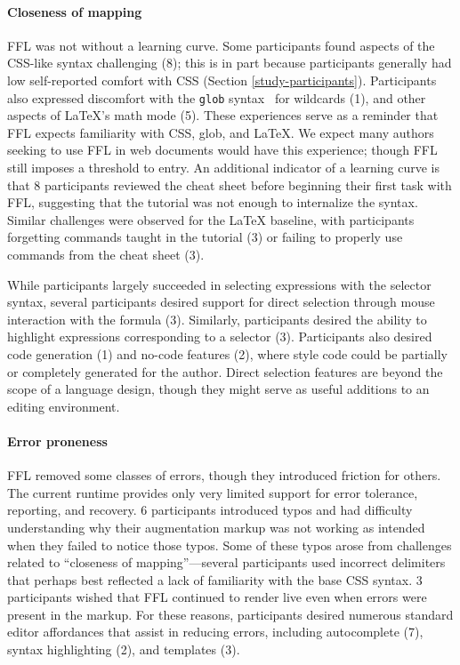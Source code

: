 \paragraph{Closeness of mapping}
FFL was not without a learning curve. Some participants found aspects of the CSS-like syntax challenging (8); this is in part because participants generally had low self-reported comfort with CSS (Section \ref{study-participants}). Participants also expressed discomfort with the \texttt{glob} syntax~\cite{UnixMan} for wildcards (1), and other aspects of LaTeX's math mode (5). These experiences serve as a reminder that FFL expects familiarity with CSS, glob, and LaTeX. We expect many authors seeking to use FFL in web documents would have this experience; though FFL still imposes a threshold to entry. An additional indicator of a learning curve is that 8 participants reviewed the cheat sheet before beginning their first task with FFL, suggesting that the tutorial was not enough to internalize the syntax. Similar challenges were observed for the LaTeX baseline, with participants forgetting commands taught in the tutorial (3) or failing to properly use commands from the cheat sheet (3).

While participants largely succeeded in selecting expressions with the selector syntax, several participants desired support for direct selection through mouse interaction with the formula (3). Similarly, participants desired the ability to highlight expressions corresponding to a selector (3). Participants also desired code generation (1) and no-code features (2), where style code could be partially or completely generated for the author. Direct selection features are beyond the scope of a language design, though they might serve as useful additions to an editing environment.

\paragraph{Error proneness}

FFL removed some classes of errors, though they introduced friction for others. The current runtime provides only very limited support for error tolerance, reporting, and recovery. 6 participants introduced typos and had difficulty understanding why their augmentation markup was not working as intended when they failed to notice those typos.
Some of these typos arose from challenges related to ``closeness of mapping''---several participants used incorrect delimiters that perhaps best reflected a lack of familiarity with the base CSS syntax. 3 participants wished that FFL continued to render live even when errors were present in the markup. For these reasons, participants desired numerous standard editor affordances that assist in reducing errors, including autocomplete (7), syntax highlighting (2), and templates (3).

